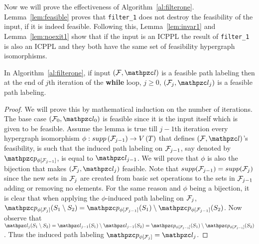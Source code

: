 Now we will prove the effectiveness of Algorithm~\ref{al:filterone}.
Lemma~\ref{lem:feasible} proves that {\tt filter\_1} does not destroy
the feasibility of the input, if it is indeed feasible. Following
this, Lemma~\ref{lem:invar1} and Lemma~\ref{lem:noexit1} show that if
the input is an ICPPL the result of {\tt filter\_1} is also an ICPPL
and they both have the same set of feasibility hypergraph
isomorphisms.

\begin{lemma}
  \label{lem:feasible}
  In Algorithm~\ref{al:filterone}, if input $(\cF, \cl)$ is a feasible path
  labeling then at the end of $j$th iteration of the {\bf while}
  loop, $j \ge 0$, $(\cF_j, \cl_j)$ is a feasible path labeling.
\end{lemma}
\begin{proof}\thesisspacing%
  We will prove this by mathematical induction on the number of
  iterations. The base case $(\cF_0, \cl_0)$ is feasible since it is
  the input itself which is given to be feasible. Assume the lemma is
  true till $j-1$th iteration \ie every hypergraph isomorphism $\phi:
  supp\left({\cal F}_{j-1}\right) \rightarrow V\left(T \right)$ that
  defines $(\cF, \cl)$'s feasibility, is such that the induced path
  labeling on ${\cal F}_{j-1}$, say denoted by $\cp_{\phi[{\cF_{j-1}}]}$,
  is equal to $\cl_{j-1}$.
  We will prove that $\phi$ is also the bijection that makes $(\cF_j,
  \cl_j)$ feasible. Note that $supp({\cal F}_{j-1}) = supp({\cal F}_{j})$ since
  the new sets in ${\cal F}_j$ are created from basic set operations to the
  sets in ${\cal F}_{j-1}$ adding or removing no elements. For the same
  reason and $\phi$ being a bijection, it is clear that when applying
  the $\phi$-induced path labeling on ${\cal F}_j$, $
  \cp_{\phi[{\cF_{j}}]}(S_1 \setminus S_2) =
  \cp_{\phi[{\cF_{j-1}}]}(S_1) \setminus
  \cp_{\phi[{\cF_{j-1}}]}(S_2)$. Now observe that $ \cl_j(S_1
  \setminus S_2) = \cl_{j-1}(S_1) \setminus \cl_{j-1}(S_2) =
  \cp_{\phi[{\cF_{j-1}}]}(S_1) \setminus
  \cp_{\phi[{\cF_{j-1}}]}(S_2)$. Thus the induced path labeling
  $\cp_{\phi[{\cF_{j}}]} = \cl_{j}$.  %
\end{proof}

